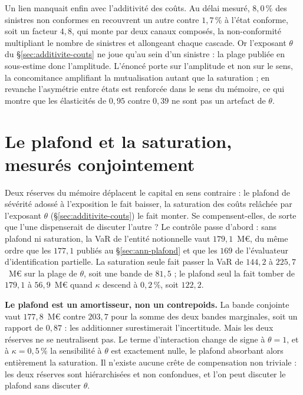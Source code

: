 \noindent Un lien manquait enfin avec l'additivité des coûts. Au délai mesuré, $8{,}0\,\%$ des
sinistres non conformes en recouvrent un autre contre $1{,}7\,\%$ à l'état conforme, soit un
facteur $4{,}8$, qui monte par deux canaux composés, la non-conformité multipliant le nombre de
sinistres et allongeant chaque cascade. Or l'exposant $\theta$ du \S\ref{sec:additivite-couts} ne
joue qu'au sein d'un sinistre : la plage publiée en sous-estime donc l'amplitude. L'énoncé porte
sur l'amplitude et non sur le sens, la concomitance amplifiant la mutualisation autant que la
saturation ; en revanche l'asymétrie entre états est renforcée dans le sens du mémoire, ce qui
montre que les élasticités de $0{,}95$ contre $0{,}39$ ne sont pas un artefact de $\theta$.

\section{Le plafond et la saturation, mesurés conjointement}
\label{sec:ann-plafond-saturation}

Deux réserves du mémoire déplacent le capital en sens contraire : le plafond de sévérité adossé à
l'exposition le fait baisser, la saturation des coûts relâchée par l'exposant $\theta$
(\S\ref{sec:additivite-couts}) le fait monter. Se compensent-elles, de sorte que l'une
dispenserait de discuter l'autre ? Le contrôle passe d'abord : sans plafond ni saturation, la VaR
de l'entité notionnelle vaut $179{,}1$~M\euro, du même ordre que les $177{,}1$ publiés au
\S\ref{sec:ann-plafond} et que les $169$ de l'évaluateur d'identification partielle. La saturation
seule fait passer la VaR de $144{,}2$ à $225{,}7$~M\euro{} sur la plage de $\theta$, soit une bande
de $81{,}5$ ; le plafond seul la fait tomber de $179{,}1$ à $56{,}9$~M\euro{} quand $\kappa$
descend à $0{,}2\,\%$, soit $122{,}2$.

\begin{cle}
\textbf{Le plafond est un amortisseur, non un contrepoids.} La bande conjointe vaut
$177{,}8$~M\euro{} contre $203{,}7$ pour la somme des deux bandes marginales, soit un rapport de
$0{,}87$ : les additionner surestimerait l'incertitude. Mais les deux réserves ne se neutralisent
pas. Le terme d'interaction change de signe à $\theta = 1$, et à $\kappa = 0{,}5\,\%$ la
sensibilité à $\theta$ est exactement nulle, le plafond absorbant alors entièrement la saturation.
Il n'existe aucune crête de compensation non triviale : les deux réserves sont hiérarchisées et non
confondues, et l'on peut discuter le plafond sans discuter $\theta$.
\end{cle}

